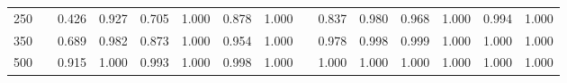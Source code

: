 % 
\begin{tabular}{ccccccccccccccc}
  \hline
  \hline
250 &  & 0.426 & 0.927 & 0.705 & 1.000 & 0.878 & 1.000 &  & 0.837 & 0.980 & 0.968 & 1.000 & 0.994 & 1.000 \\ 
  350 &  & 0.689 & 0.982 & 0.873 & 1.000 & 0.954 & 1.000 &  & 0.978 & 0.998 & 0.999 & 1.000 & 1.000 & 1.000 \\ 
  500 &  & 0.915 & 1.000 & 0.993 & 1.000 & 0.998 & 1.000 &  & 1.000 & 1.000 & 1.000 & 1.000 & 1.000 & 1.000 \\ 
   \hline
\end{tabular}
